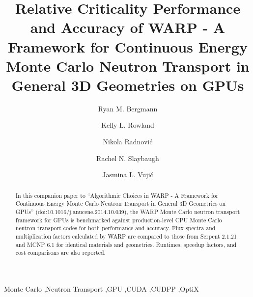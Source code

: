 \documentclass[preprint,12pt]{elsarticle}
\begin{document}
\begin{frontmatter}



\title{Relative Criticality Performance and Accuracy of WARP - A Framework for Continuous Energy Monte Carlo Neutron Transport in General 3D Geometries on GPUs}


\author{Ryan M. Bergmann}

\author{Kelly L. Rowland}

\author{Nikola Radnovi\'c}

\author{Rachel N. Slaybaugh}

\author{Jasmina L. Vuji\'c}


\address{Department of Nuclear Engineering, 
4155 Etcheverry Hall, 
University of California - Berkeley,
Berkeley, CA 94720-1730}

\begin{abstract}

In this companion paper to ``Algorithmic Choices in WARP - A Framework for Continuous Energy Monte Carlo Neutron Transport in General 3D Geometries on GPUs'' (doi:10.1016/j.anucene.2014.10.039), the WARP Monte Carlo neutron transport framework for GPUs is benchmarked against production-level CPU Monte Carlo neutron transport codes for both performance and accuracy.  Flux spectra and multiplication factors calculated by WARP are compared to those from Serpent 2.1.21 and MCNP 6.1 for identical materials and geometries.  Runtimes, speedup factors, and cost comparisons are also reported.

\end{abstract}

\begin{keyword}
Monte Carlo \sep Neutron Transport \sep GPU \sep CUDA \sep CUDPP \sep OptiX


\end{keyword}

\end{frontmatter}
\end{document}
